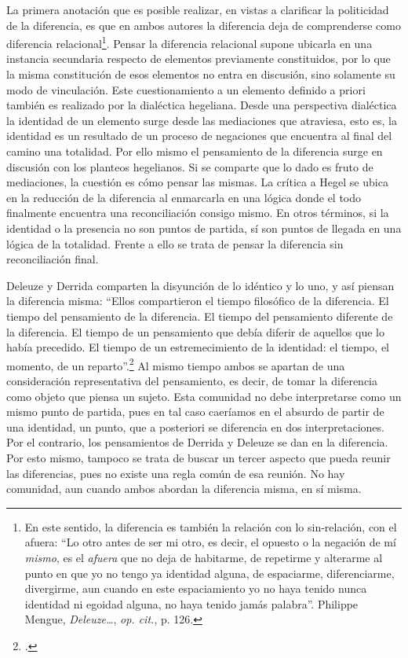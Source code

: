 La primera anotación que es posible realizar, en vistas a clarificar la
politicidad de la diferencia, es que en ambos autores la diferencia deja
de comprenderse como diferencia relacional\footnote{En este sentido, la
  diferencia es también la relación con lo sin-relación, con el afuera:
  \enquote{Lo otro antes de ser mi otro, es decir, el opuesto o la negación de
  mí \emph{mismo}, es el \emph{afuera} que no deja de habitarme, de
  repetirme y alterarme al punto en que yo no tengo ya identidad alguna,
  de espaciarme, diferenciarme, divergirme, aun cuando en este
  espaciamiento yo no haya tenido nunca identidad ni egoidad alguna, no
  haya tenido jamás palabra}. Philippe Mengue, \emph{Deleuze\ldots{}},
  \emph{op. cit.}, p. 126.}. Pensar la diferencia relacional supone
ubicarla en una instancia secundaria respecto de elementos previamente
constituidos, por lo que la misma constitución de esos elementos no
entra en discusión, sino solamente su modo de vinculación. Este
cuestionamiento a un elemento definido a priori también es realizado por
la dialéctica hegeliana. Desde una perspectiva dialéctica la identidad
de un elemento surge desde las mediaciones que atraviesa, esto es, la
identidad es un resultado de un proceso de negaciones que encuentra al
final del camino una totalidad. Por ello mismo el pensamiento de la
diferencia surge en discusión con los planteos hegelianos. Si se
comparte que lo dado es fruto de mediaciones, la cuestión es cómo pensar
las mismas. La crítica a Hegel se ubica en la reducción de la diferencia
al enmarcarla en una lógica donde el todo finalmente encuentra una
reconciliación consigo mismo. En otros términos, si la identidad o la
presencia no son puntos de partida, sí son puntos de llegada en una
lógica de la totalidad. Frente a ello se trata de pensar la diferencia
sin reconciliación final.

Deleuze y Derrida comparten la disyunción de lo idéntico y lo uno, y así
piensan la diferencia misma: \enquote{Ellos compartieron el tiempo filosófico de
la diferencia. El tiempo del pensamiento de la diferencia. El tiempo del
pensamiento diferente de la diferencia. El tiempo de un pensamiento que
debía diferir de aquellos que lo había precedido. El tiempo de un
estremecimiento de la identidad: el tiempo, el momento, de un
reparto}.\footcite[250]{nancy2008} Al mismo tiempo ambos se apartan
de una consideración representativa del pensamiento, es decir, de tomar
la diferencia como objeto que piensa un sujeto. Esta comunidad no debe
interpretarse como un mismo punto de partida, pues en tal caso caeríamos
en el absurdo de partir de una identidad, un punto, que a posteriori se
diferencia en dos interpretaciones. Por el contrario, los pensamientos
de Derrida y Deleuze se dan en la diferencia. Por esto mismo, tampoco se
trata de buscar un tercer aspecto que pueda reunir las diferencias, pues
no existe una regla común de esa reunión. No hay comunidad, aun cuando
ambos abordan la diferencia misma, en sí misma.

